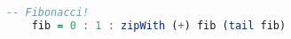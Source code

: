 \documentclass[a4paper,10pt]{article}
\begin{document}
  \begin{lstlisting}[language=haskell]
    -- Fibonacci!
    fib = 0 : 1 : zipWith (+) fib (tail fib)
  \end{lstlisting}
  
\end{document}
